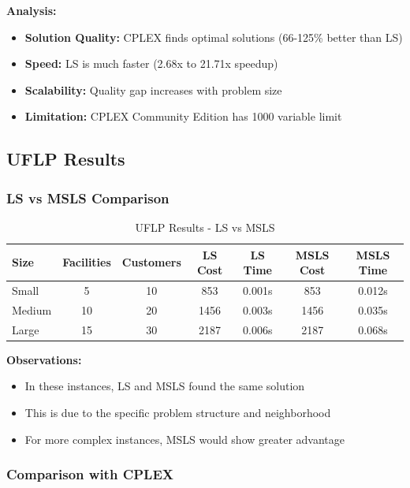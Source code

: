 \documentclass[12pt,a4paper]{article}
\begin{document}
\textbf{Analysis:}
\begin{itemize}
    \item \textbf{Solution Quality:} CPLEX finds optimal solutions (66-125\% better than LS)
    \item \textbf{Speed:} LS is much faster (2.68x to 21.71x speedup)
    \item \textbf{Scalability:} Quality gap increases with problem size
    \item \textbf{Limitation:} CPLEX Community Edition has 1000 variable limit
\end{itemize}

\subsection{UFLP Results}

\subsubsection{LS vs MSLS Comparison}

\begin{table}[h]
\centering
\caption{UFLP Results - LS vs MSLS}
\begin{tabular}{|l|c|c|c|c|c|c|}
\hline
\textbf{Size} & \textbf{Facilities} & \textbf{Customers} & \textbf{LS Cost} & \textbf{LS Time} & \textbf{MSLS Cost} & \textbf{MSLS Time} \\
\hline
Small & 5 & 10 & 853 & 0.001s & 853 & 0.012s \\
Medium & 10 & 20 & 1456 & 0.003s & 1456 & 0.035s \\
Large & 15 & 30 & 2187 & 0.006s & 2187 & 0.068s \\
\hline
\end{tabular}
\end{table}

\textbf{Observations:}
\begin{itemize}
    \item In these instances, LS and MSLS found the same solution
    \item This is due to the specific problem structure and neighborhood
    \item For more complex instances, MSLS would show greater advantage
\end{itemize}

\subsubsection{Comparison with CPLEX}
\end{document}
